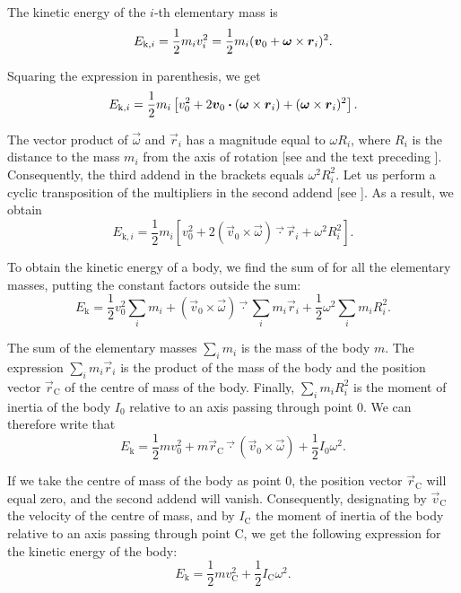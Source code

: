 The kinetic energy of the $i$-th elementary mass is
\begin{equation*}
	E_{\text{k},i} = \frac{1}{2}m_i v_i^2 = \frac{1}{2}m_i (\boldsymbol{v}_0 + \boldsymbol{\omega}\times\boldsymbol{r}_i)^2.
\end{equation*}

\noindent
Squaring the expression in parenthesis, we get
\begin{equation*}
	E_{\text{k},i} = \frac{1}{2}m_i \left[v_0^2 + 2\boldsymbol{v}_0\boldsymbol{\cdot}(\boldsymbol{\omega}\times\boldsymbol{r}_i) + (\boldsymbol{\omega}\times\boldsymbol{r}_i)^2\right].
\end{equation*}

\noindent
The vector product of $\vec{\omega}$ and $\vec{r}_i$ has a magnitude equal to $\omega R_i$, where $R_i$ is the distance to the mass $m_i$ from the axis of rotation [see  and the text preceding ]. Consequently, the third addend in the brackets equals $\omega^2R_i^2$. Let us perform a cyclic transposition of the multipliers in the second addend [see ]. As a result, we obtain
\begin{equation*}
	E_{\text{k},i} = \frac{1}{2}m_i \left[v_0^2 + 2(\vec{v}_0\times\vec{\omega})\vec{\cdot}\vec{r}_i + \omega^2 R_i^2\right].
\end{equation*}

To obtain the kinetic energy of a body, we find the sum of  for all the elementary masses, putting the constant factors outside the sum:
\begin{equation*}
	E_{\text{k}} = \frac{1}{2} v_0^2 \sum_i m_i + (\vec{v}_0\times\vec{\omega})\vec{\cdot}\sum_i m_i\vec{r}_i + \frac{1}{2}\omega^2 \sum_i m_iR_i^2.
\end{equation*}

\noindent
The sum of the elementary masses $\sum_i m_i$ is the mass of the body $m$. The expression $\sum_i m_i\vec{r}_i$ is the product of the mass of the body and the position vector $\vec{r}_{\text{C}}$ of the centre of mass of the body. Finally, $\sum_i m_iR_i^2$ is the moment of inertia of the body $I_0$ relative to an axis passing through point $0$. We can therefore write that
\begin{equation}\label{eq:5_54}
	E_{\text{k}} = \frac{1}{2} mv_0^2 + m\vec{r}_{\text{C}}\vec{\cdot}(\vec{v}_0\times\vec{\omega}) + \frac{1}{2} I_0\omega^2.
\end{equation}

If we take the centre of mass of the body as point $0$, the position vector $\vec{r}_{\text{C}}$ will equal zero, and the second addend will vanish. Consequently, designating by $\vec{v}_{\text{C}}$ the velocity of the centre of mass, and by $I_{\text{C}}$ the moment of inertia of the body relative to an axis passing through point C, we get the following expression for the kinetic energy of the body:
\begin{equation}\label{eq:5_55}
	E_{\text{k}} = \frac{1}{2}m v_{\text{C}}^2 + \frac{1}{2} I_{\text{C}} \omega^2.
\end{equation}

